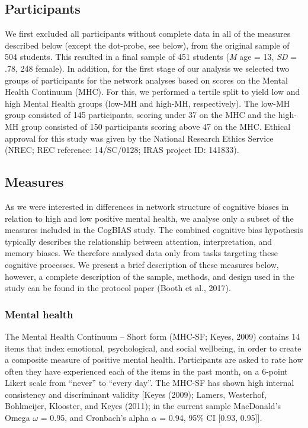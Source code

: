 \documentclass[man,floatsintext]{apa6}
\begin{document}
\hypertarget{participants}{%
\subsection{Participants}\label{participants}}

We first excluded all participants without complete data in all of the measures described below (except the dot-probe, see below), from the original sample of 504 students. This resulted in a final sample of 451 students (\emph{M} age = 13, \emph{SD} = .78, 248 female). In addition, for the first stage of our analysis we selected two groups of participants for the network analyses based on scores on the Mental Health Continuum (MHC). For this, we performed a tertile split to yield low and high Mental Health groups (low-MH and high-MH, respectively). The low-MH group consisted of 145 participants, scoring under 37 on the MHC and the high-MH group consisted of 150 participants scoring above 47 on the MHC. Ethical approval for this study was given by the National Research Ethics Service (NREC; REC reference: 14/SC/0128; IRAS project ID: 141833).

\hypertarget{measures}{%
\subsection{Measures}\label{measures}}

As we were interested in differences in network structure of cognitive biases in relation to high and low positive mental health, we analyse only a subset of the measures included in the CogBIAS study. The combined cognitive bias hypothesis typically describes the relationship between attention, interpretation, and memory biases. We therefore analysed data only from tasks targeting these cognitive processes. We present a brief description of these measures below, however, a complete description of the sample, methods, and design used in the study can be found in the protocol paper (Booth et al., 2017).

\hypertarget{mental-health}{%
\subsubsection{Mental health}\label{mental-health}}

The Mental Health Continuum -- Short form (MHC-SF; Keyes, 2009) contains 14 items that index emotional, psychological, and social wellbeing, in order to create a composite measure of positive mental health. Participants are asked to rate how often they have experienced each of the items in the past month, on a 6-point Likert scale from \enquote{never} to \enquote{every day}. The MHC-SF has shown high internal consistency and discriminant validity {[}Keyes (2009); Lamers, Westerhof, Bohlmeijer, Klooster, and Keyes (2011); in the current sample MacDonald's Omega \(\omega\) = 0.95, and Cronbach's alpha \(\alpha\) = 0.94, 95\% CI {[}0.93, 0.95{]}{]}.
\end{document}
